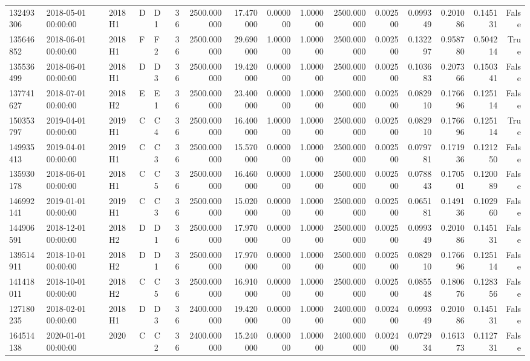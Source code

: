 \begin{tabular}{lllllrrrrrrrrrrr}
132493306 & 2018-05-01 00:00:00 & 2018H1 & D & D1 & 36 & 2500.000000 & 17.470000 & 0.000000 & 1.000000 & 2500.000000 & 0.002500 & 0.099349 & 0.201086 & 0.145131 & False \\
135646852 & 2018-06-01 00:00:00 & 2018H1 & F & F2 & 36 & 2500.000000 & 29.690000 & 1.000000 & 1.000000 & 2500.000000 & 0.002500 & 0.132297 & 0.958780 & 0.504214 & True \\
135536499 & 2018-06-01 00:00:00 & 2018H1 & D & D3 & 36 & 2500.000000 & 19.420000 & 0.000000 & 1.000000 & 2500.000000 & 0.002500 & 0.103683 & 0.207366 & 0.150341 & False \\
137741627 & 2018-07-01 00:00:00 & 2018H2 & E & E1 & 36 & 2500.000000 & 23.400000 & 0.000000 & 1.000000 & 2500.000000 & 0.002500 & 0.082910 & 0.176696 & 0.125114 & False \\
150353797 & 2019-04-01 00:00:00 & 2019H1 & C & C4 & 36 & 2500.000000 & 16.400000 & 1.000000 & 1.000000 & 2500.000000 & 0.002500 & 0.082910 & 0.176696 & 0.125114 & True \\
149935413 & 2019-04-01 00:00:00 & 2019H1 & C & C3 & 36 & 2500.000000 & 15.570000 & 0.000000 & 1.000000 & 2500.000000 & 0.002500 & 0.079781 & 0.171936 & 0.121250 & False \\
135930178 & 2018-06-01 00:00:00 & 2018H1 & C & C5 & 36 & 2500.000000 & 16.460000 & 0.000000 & 1.000000 & 2500.000000 & 0.002500 & 0.078843 & 0.170501 & 0.120089 & False \\
146992141 & 2019-01-01 00:00:00 & 2019H1 & C & C3 & 36 & 2500.000000 & 15.020000 & 0.000000 & 1.000000 & 2500.000000 & 0.002500 & 0.065181 & 0.149136 & 0.102960 & False \\
144906591 & 2018-12-01 00:00:00 & 2018H2 & D & D1 & 36 & 2500.000000 & 17.970000 & 0.000000 & 1.000000 & 2500.000000 & 0.002500 & 0.099349 & 0.201086 & 0.145131 & False \\
139514911 & 2018-10-01 00:00:00 & 2018H2 & D & D1 & 36 & 2500.000000 & 17.970000 & 0.000000 & 1.000000 & 2500.000000 & 0.002500 & 0.082910 & 0.176696 & 0.125114 & False \\
141418011 & 2018-10-01 00:00:00 & 2018H2 & C & C5 & 36 & 2500.000000 & 16.910000 & 0.000000 & 1.000000 & 2500.000000 & 0.002500 & 0.085548 & 0.180676 & 0.128356 & False \\
127180235 & 2018-02-01 00:00:00 & 2018H1 & D & D3 & 36 & 2400.000000 & 19.420000 & 0.000000 & 1.000000 & 2400.000000 & 0.002400 & 0.099349 & 0.201086 & 0.145131 & False \\
164514138 & 2020-01-01 00:00:00 & 2020 & C & C2 & 36 & 2400.000000 & 15.240000 & 0.000000 & 1.000000 & 2400.000000 & 0.002400 & 0.072934 & 0.161373 & 0.112731 & False \\

\end{tabular}
